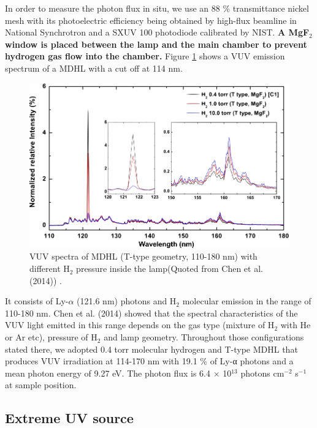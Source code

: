 In order to measure the photon flux in situ, we use an 88 \% transmittance nickel mesh with its photoelectric efficiency being obtained by high-flux beamline in National Synchrotron and a SXUV 100 photodiode calibrated by NIST. \textbf{A MgF$_2$ window is placed between the lamp and the main chamber to prevent hydrogen gas flow into the chamber.} Figure \ref{fig:MDHL} shows a VUV emission spectrum of a MDHL with a cut off at 114 nm.
\begin{figure}
\centering
\includegraphics[width=\textwidth]{figures/chapter2/MDHL.png}
\caption{VUV spectra of MDHL (T-type geometry, 110-180 nm) with different H$_2$ pressure inside the lamp(Quoted from Chen et al. (2014)\cite{chen2013vacuum}) .}
\label{fig:MDHL}
\end{figure}
It consists of Ly-$\alpha$ (121.6 nm) photons and H$_2$ molecular emission in the range of 110-180 nm. Chen et al. (2014)\cite{chen2013vacuum} showed that the spectral characteristics of the VUV light emitted in this range depends on the gas type (mixture of H$_2$ with He or Ar etc), pressure of H$_2$ and lamp geometry. Throughout those configurations stated there, we adopted 0.4 torr molecular hydrogen and T-type MDHL that produces VUV irradiation at 114-170 nm with 19.1 \% of Ly-α photons and a mean photon energy of 9.27 eV. The photon flux is 6.4 $\times$ 10$^{13}$ photons cm$^{-2}$ s$^{-1}$ at sample position.

\subsection{\textbf{Extreme UV} source}
\label{sec:Extreme_EUV_source}


